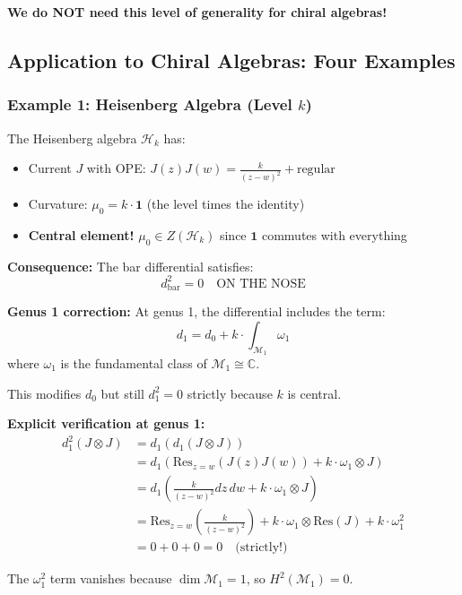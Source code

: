 \textbf{We do NOT need this level of generality for chiral algebras!}

\subsection{Application to Chiral Algebras: Four Examples}

\subsubsection{Example 1: Heisenberg Algebra (Level $k$)}

\begin{example}\label{ex:heisenberg-strict}
The Heisenberg algebra $\mathcal{H}_k$ has:
\begin{itemize}
\item Current $J$ with OPE: $J(z)J(w) = \frac{k}{(z-w)^2} + \text{regular}$
\item Curvature: $\mu_0 = k \cdot \mathbf{1}$ (the level times the identity)
\item \textbf{Central element!} $\mu_0 \in Z(\mathcal{H}_k)$ since $\mathbf{1}$ commutes with everything
\end{itemize}

\textbf{Consequence:} The bar differential satisfies:
$$d_{\text{bar}}^2 = 0 \quad \text{ON THE NOSE}$$

\textbf{Genus 1 correction:}
At genus 1, the differential includes the term:
$$d_1 = d_0 + k \cdot \int_{\mathcal{M}_1} \omega_1$$
where $\omega_1$ is the fundamental class of $\mathcal{M}_1 \cong \mathbb{C}$.

This modifies $d_0$ but still $d_1^2 = 0$ strictly because $k$ is central.

\textbf{Explicit verification at genus 1:}
\begin{align}
d_1^2(J \otimes J) &= d_1(d_1(J \otimes J)) \\
&= d_1\left(\text{Res}_{z=w}(J(z)J(w)) + k \cdot \omega_1 \otimes J\right) \\
&= d_1\left(\frac{k}{(z-w)^2} dz \, dw + k \cdot \omega_1 \otimes J\right) \\
&= \text{Res}_{z=w}\left(\frac{k}{(z-w)^2}\right) + k \cdot \omega_1 \otimes \text{Res}(J) 
+ k \cdot \omega_1^2 \\
&= 0 + 0 + 0 = 0 \quad \text{(strictly!)}
\end{align}

The $\omega_1^2$ term vanishes because $\dim \mathcal{M}_1 = 1$, so $H^2(\mathcal{M}_1) = 0$.
\end{example}

